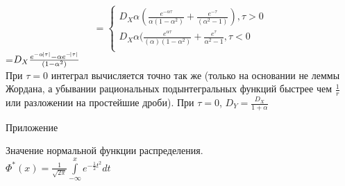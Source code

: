 \documentclass[russian, 12pt, fleqn]{article}
\begin{document}
\begin{equation*}
= 
 \begin{cases}
D_X \alpha (\frac{e^{-\alpha \tau}}{\alpha (1 - \alpha ^ 2)} + \frac{e^{-\tau}}{(\alpha ^ 2 - 1)}), \tau > 0\\
D_X\alpha (\frac{e^{\alpha \tau}}{(\alpha)(1 - \alpha^2) } +  \frac{e^{\tau}}{\alpha^2 - 1}, \tau < 0\\
 \end{cases}
\end{equation*}
=$D_X \frac{e^{-\alpha \abs{\tau}} - \alpha e^{-\abs{\tau}}}{(1 - \alpha^2)}$\\
При $\tau = 0$ интеграл вычисляется точно так же (только на основании не леммы Жордана, а убывании рациональных подынтегральных функций быстрее чем $\frac{1}{r}$ или разложении на простейшие дроби). При $\tau = 0 $, $D_Y = \frac{D_X}{1 + \alpha}$\\
\newpage
\begin{center}
$\textbf{Приложение}$
\end{center}
\begin{center}
Значение нормальной функции распределения.\\
$\Phi^*(x) = \frac{1}{\sqrt{2\pi} } \displaystyle{\int \limits_{-\infty}^{x}} e^{-\frac{1}{2}t^2} dt$\\
\end{center}
\end{document}
